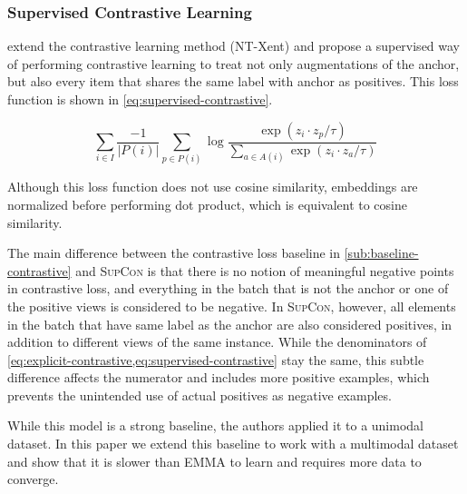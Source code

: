 \documentclass[sigconf,natbib=true,anonymous=true]{acmart}
\newcommand{\ours}{\textsc{EMMA}}
\newcommand{\supcon}{\textsc{SupCon}}
\begin{document}
\subsubsection{Supervised Contrastive Learning}
\label{sub:baseline-supcon}

\citet{NEURIPS2020_supervised_contrastive} extend the contrastive learning method (NT-Xent) and propose a supervised way of performing contrastive learning to treat not only augmentations of the anchor, but also every item that shares the same label with anchor as positives. This loss function is shown in \cref{eq:supervised-contrastive}.

\begin{equation}\label{eq:supervised-contrastive}
    \sum_{i \in I} \frac{-1}{|P(i)|} \sum_{p \in P(i)} \log \frac{\exp (z_i \cdot z_p / \tau) }{\sum_{a \in A(i)} \exp (z_i \cdot z_a / \tau)}
\end{equation}


Although this loss function does not use cosine similarity, embeddings are normalized before performing dot product, which is equivalent to cosine similarity.

The main difference between the contrastive loss baseline in \cref{sub:baseline-contrastive} and \supcon{} is that there is no notion of meaningful negative points in contrastive loss, and everything in the batch that is not the anchor or one of the positive views is considered to be negative. In \supcon{}, however, all elements in the batch that have same label as the anchor are also considered positives, in addition to different views of the same instance. While the denominators of \cref{eq:explicit-contrastive,eq:supervised-contrastive} stay the same, this subtle difference affects the numerator and includes more positive examples, which prevents the unintended use of actual positives as negative examples.

While this model is a strong baseline, the authors applied it to a unimodal dataset. In this paper we extend this baseline to work with a multimodal dataset and show that it is slower than \ours{} to learn and requires more data to converge.
\end{document}

